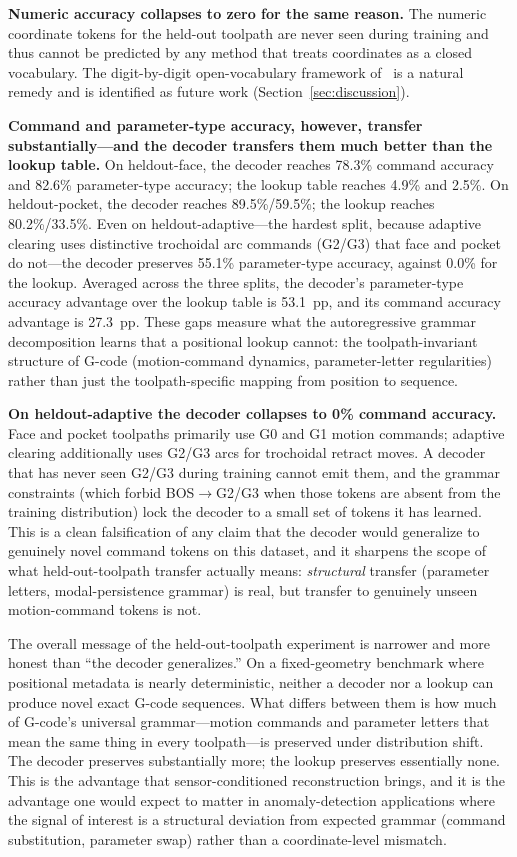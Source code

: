 \documentclass[sensors,article,submit,moreauthors,pdftex]{Definitions/mdpi}
\begin{document}
\textbf{Numeric accuracy collapses to zero for the same reason.} The numeric coordinate tokens for the held-out toolpath are never seen during training and thus cannot be predicted by any method that treats coordinates as a closed vocabulary. The digit-by-digit open-vocabulary framework of~\cite{grammar_paper} is a natural remedy and is identified as future work (Section~\ref{sec:discussion}).

\textbf{Command and parameter-type accuracy, however, transfer substantially---and the decoder transfers them much better than the lookup table.} On heldout-face, the decoder reaches 78.3\% command accuracy and 82.6\% parameter-type accuracy; the lookup table reaches 4.9\% and 2.5\%. On heldout-pocket, the decoder reaches 89.5\%/59.5\%; the lookup reaches 80.2\%/33.5\%. Even on heldout-adaptive---the hardest split, because adaptive clearing uses distinctive trochoidal arc commands (G2/G3) that face and pocket do not---the decoder preserves 55.1\% parameter-type accuracy, against 0.0\% for the lookup. Averaged across the three splits, the decoder's parameter-type accuracy advantage over the lookup table is 53.1~pp, and its command accuracy advantage is 27.3~pp. These gaps measure what the autoregressive grammar decomposition learns that a positional lookup cannot: the toolpath-invariant structure of G-code (motion-command dynamics, parameter-letter regularities) rather than just the toolpath-specific mapping from position to sequence.

\textbf{On heldout-adaptive the decoder collapses to 0\% command accuracy.} Face and pocket toolpaths primarily use G0 and G1 motion commands; adaptive clearing additionally uses G2/G3 arcs for trochoidal retract moves. A decoder that has never seen G2/G3 during training cannot emit them, and the grammar constraints (which forbid BOS$\to$G2/G3 when those tokens are absent from the training distribution) lock the decoder to a small set of tokens it has learned. This is a clean falsification of any claim that the decoder would generalize to genuinely novel command tokens on this dataset, and it sharpens the scope of what held-out-toolpath transfer actually means: \emph{structural} transfer (parameter letters, modal-persistence grammar) is real, but transfer to genuinely unseen motion-command tokens is not.

The overall message of the held-out-toolpath experiment is narrower and more honest than ``the decoder generalizes.'' On a fixed-geometry benchmark where positional metadata is nearly deterministic, neither a decoder nor a lookup can produce novel exact G-code sequences. What differs between them is how much of G-code's universal grammar---motion commands and parameter letters that mean the same thing in every toolpath---is preserved under distribution shift. The decoder preserves substantially more; the lookup preserves essentially none. This is the advantage that sensor-conditioned reconstruction brings, and it is the advantage one would expect to matter in anomaly-detection applications where the signal of interest is a structural deviation from expected grammar (command substitution, parameter swap) rather than a coordinate-level mismatch.
\end{document}
